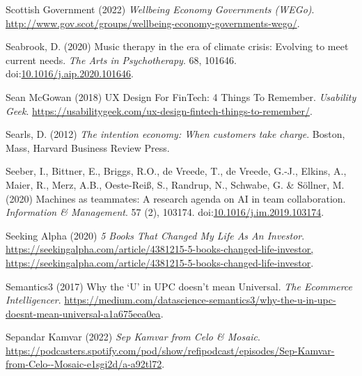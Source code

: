 \documentclass[
  letterpaper,
  DIV=11,
  numbers=noendperiod]{scrartcl}
\newlength{\cslhangindent}
\newenvironment{CSLReferences}[2] %
 {\begin{list}{}{%
  \setlength{\itemindent}{0pt}
  \setlength{\leftmargin}{0pt}
  \setlength{\parsep}{0pt}
  \ifodd #1
   \setlength{\leftmargin}{\cslhangindent}
   \setlength{\itemindent}{-1\cslhangindent}
  \fi
  \setlength{\itemsep}{#2\baselineskip}}}
 {\end{list}}
\begin{document}
\begin{CSLReferences}{0}{1}
Scottish Government (2022) \emph{Wellbeing {Economy Governments}
({WEGo})}.
\url{http://www.gov.scot/groups/wellbeing-economy-governments-wego/}.

Seabrook, D. (2020) Music therapy in the era of climate crisis:
{Evolving} to meet current needs. \emph{The Arts in Psychotherapy}. 68,
101646.
doi:\href{https://doi.org/10.1016/j.aip.2020.101646}{10.1016/j.aip.2020.101646}.

Sean McGowan (2018) {UX Design For FinTech}: 4 {Things To Remember}.
\emph{Usability Geek}.
\url{https://usabilitygeek.com/ux-design-fintech-things-to-remember/}.

Searls, D. (2012) \emph{The intention economy: When customers take
charge}. Boston, Mass, Harvard Business Review Press.

Seeber, I., Bittner, E., Briggs, R.O., de Vreede, T., de Vreede, G.-J.,
Elkins, A., Maier, R., Merz, A.B., Oeste-Reiß, S., Randrup, N., Schwabe,
G. \& Söllner, M. (2020) Machines as teammates: {A} research agenda on
{AI} in team collaboration. \emph{Information \& Management}. 57 (2),
103174.
doi:\href{https://doi.org/10.1016/j.im.2019.103174}{10.1016/j.im.2019.103174}.

Seeking Alpha (2020) \emph{5 {Books That Changed My Life As An
Investor}}.
\href{https://seekingalpha.com/article/4381215-5-books-changed-life-investor,\%20https://seekingalpha.com/article/4381215-5-books-changed-life-investor}{https://seekingalpha.com/article/4381215-5-books-changed-life-investor,
https://seekingalpha.com/article/4381215-5-books-changed-life-investor}.

Semantics3 (2017) Why the {`{U}'} in {UPC} doesn't mean {Universal}.
\emph{The Ecommerce Intelligencer}.
\url{https://medium.com/datascience-semantics3/why-the-u-in-upc-doesnt-mean-universal-a1a675eea0ea}.

Sepandar Kamvar (2022) \emph{Sep {Kamvar} from {Celo} \& {Mosaic}}.
\url{https://podcasters.spotify.com/pod/show/refipodcast/episodes/Sep-Kamvar-from-Celo--Mosaic-e1sgi2d/a-a92tl72}.


\end{CSLReferences}
\end{document}
